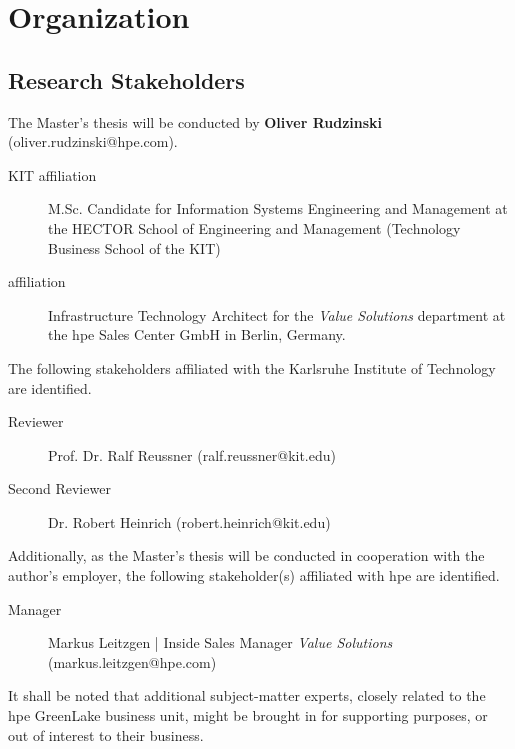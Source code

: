 \chapter{Organization}
\label{ch:organization}

	\section{Research Stakeholders} \label{sec:organization-stakeholders}
	
	The Master's thesis will be conducted by \textbf{Oliver Rudzinski} (oliver.rudzinski@hpe.com).
	\begin{description}
		\item[KIT affiliation] M.Sc. Candidate for Information Systems Engineering and Management at the HECTOR School of Engineering and Management (Technology Business School of the KIT)
		\item[ affiliation] Infrastructure Technology Architect for the \textit{Value Solutions} department at the \acl{hpe} Sales Center GmbH in Berlin, Germany. 
	\end{description}
	
	The following stakeholders affiliated with the Karlsruhe Institute of Technology are identified.
		
	\begin{description}
		\item[Reviewer] Prof. Dr. Ralf Reussner (ralf.reussner@kit.edu)
		\item[Second Reviewer] Dr. Robert Heinrich (robert.heinrich@kit.edu)
	\end{description}
	
	Additionally, as the Master's thesis will be conducted in cooperation with the author's employer, the following stakeholder(s) affiliated with \ac{hpe} are identified.
	
	\begin{description}
		\item[Manager] Markus Leitzgen | Inside Sales Manager \textit{Value Solutions} (markus.leitzgen@hpe.com) 
	\end{description}
	
	It shall be noted that additional subject-matter experts, closely related to the \ac{hpe} GreenLake business unit, might be brought in for supporting purposes, or out of interest to their business.	


